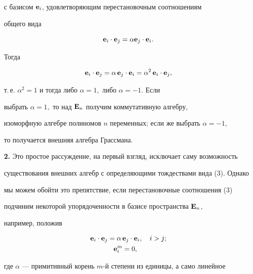 с базисом ${\bold e}_i$, удовлетворяющим перестановочным соотношениям


общего вида


\begin{equation}


{\bold e}_i\cdot {\bold e}_j = \alpha {\bold e}_j\cdot {\bold e}_i.


\end{equation}


Тогда


$$


{\bold e}_i\cdot {\bold e}_j = \alpha\, {\bold e}_j\cdot {\bold e}_i =


\alpha^2\, {\bold e}_i\cdot {\bold e}_j,


$$


т.\,е. $\alpha^2=1$ и тогда либо $\alpha = 1,$ либо $\alpha =-1.$ Если


выбрать $\alpha = 1,$ то над ${\bold E}_n$ получим коммутативную алгебру,


изоморфную алгебре полиномов $n$ переменных; если же выбрать $\alpha =-1,$


то получается внешняя алгебра Грассмана.


\medskip





{\bf 2.} Это простое рассуждение, на первый взгляд, исключает саму возможность


существования внешних алгебр с определяющими тождествами вида (3). Однако


мы можем обойти это препятствие, если перестановочные соотношения (3)


подчиним некоторой упорядоченности в базисе пространства ${\bold E}_n$,


например, положив


\begin{equation}


\begin{split}


{\bold e}_i\cdot {\bold e}_j = \alpha\, &{\bold e}_j\cdot {\bold e}_i,


\quad i>j;\\


{\bold e}_i^m &= 0,


\end{split}


\end{equation}


где $\alpha$ --- примитивный корень $m$-й степени из единицы, а само линейное


